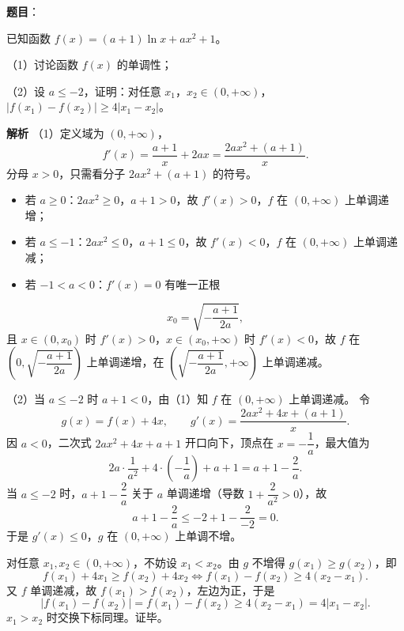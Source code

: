\begin{answer}

\textbf{题目}：

已知函数 $f(x)=(a+1)\ln x+ax^2+1$。

（1）讨论函数 $f(x)$ 的单调性；

（2）设 $a\leqslant-2$，证明：对任意 $x_1$，$x_2\in(0,+\infty)$，$|f(x_1)-f(x_2)|\geqslant4|x_1-x_2|$。

\textbf{解析}
（1）定义域为 $(0,+\infty)$，
\nopagebreak[4]
\[f'(x)=\frac{a+1}{x}+2ax=\frac{2ax^2+(a+1)}{x}.\]
分母 $x>0$，只需看分子 $2ax^2+(a+1)$ 的符号。

\begin{itemize}
\item 若 $a\geqslant0$：$2ax^2\geqslant0$，$a+1>0$，故 $f'(x)>0$，$f$ 在 $(0,+\infty)$ 上单调递增；
\item 若 $a\leqslant-1$：$2ax^2\leqslant0$，$a+1\leqslant0$，故 $f'(x)<0$，$f$ 在 $(0,+\infty)$ 上单调递减；
\item 若 $-1<a<0$：$f'(x)=0$ 有唯一正根
\end{itemize}
\nopagebreak[4]
\[x_0=\sqrt{-\frac{a+1}{2a}},\]
且 $x\in(0,x_0)$ 时 $f'(x)>0$，$x\in(x_0,+\infty)$ 时 $f'(x)<0$，故 $f$ 在 $\left(0,\sqrt{-\dfrac{a+1}{2a}}\right)$ 上单调递增，在 $\left(\sqrt{-\dfrac{a+1}{2a}},+\infty\right)$ 上单调递减。

（2）当 $a\leqslant-2$ 时 $a+1<0$，由（1）知 $f$ 在 $(0,+\infty)$ 上单调递减。
令
\nopagebreak[4]
\[g(x)=f(x)+4x,\qquad g'(x)=\frac{2ax^2+4x+(a+1)}{x}.\]
因 $a<0$，二次式 $2ax^2+4x+a+1$ 开口向下，顶点在 $x=-\dfrac1a$，最大值为
\nopagebreak[4]
\[2a\cdot\frac1{a^2}+4\cdot\left(-\frac1a\right)+a+1=a+1-\frac2a.\]
当 $a\leqslant-2$ 时，$a+1-\dfrac2a$ 关于 $a$ 单调递增（导数 $1+\dfrac{2}{a^2}>0$），故
\nopagebreak[4]
\[a+1-\frac2a\leqslant-2+1-\frac2{-2}=0.\]
于是 $g'(x)\leqslant0$，$g$ 在 $(0,+\infty)$ 上单调不增。

对任意 $x_1,x_2\in(0,+\infty)$，不妨设 $x_1<x_2$。由 $g$ 不增得 $g(x_1)\geqslant g(x_2)$，即
\nopagebreak[4]
\[f(x_1)+4x_1\geqslant f(x_2)+4x_2\iff f(x_1)-f(x_2)\geqslant4(x_2-x_1).\]
又 $f$ 单调递减，故 $f(x_1)>f(x_2)$，左边为正，于是
\nopagebreak[4]
\[|f(x_1)-f(x_2)|=f(x_1)-f(x_2)\geqslant4(x_2-x_1)=4|x_1-x_2|.\]
$x_1>x_2$ 时交换下标同理。证毕。


\end{answer}
